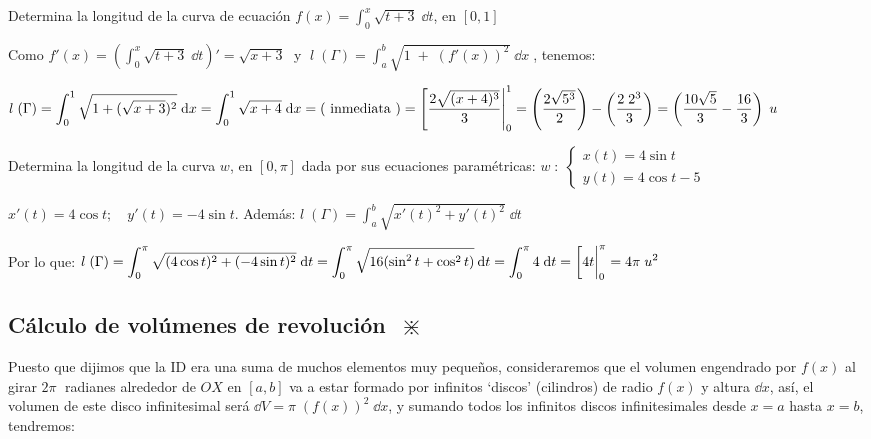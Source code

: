\begin{ejem}
Determina la longitud de la curva de ecuación $f(x)= \displaystyle \int_0^x \sqrt{t+3}\; \dd t$, en $[0,1]$

\vspace{2mm}

Como $f'(x)= \left( \displaystyle \int_0^x \sqrt{t+3}\; \dd t  \right)' =\sqrt{x+3}\;$ 	 y  $\; \displaystyle l\; (\Gamma)=\int_a^b \sqrt{1\; + \; (f'(x))^2}\; \dd x\;$, tenemos:

$\displaystyle l\; (\Gamma)= \int_0^1 \sqrt{ 1 + (\sqrt{x+3})^2 } \; \dd x = \int_0^1\sqrt{x+4}\; \dd x= (\text { inmediata })= \eval[\dfrac {2\sqrt{(x+4)^3}}{3}|_0^1= \left(\dfrac {2 \sqrt{5^3}}{2}  \right )-\left( \dfrac {2\; 2^3}{3} \right)= \left(\dfrac{10\sqrt{5}}{3}-\dfrac{16}{3} \right)\; u$

\end{ejem}

\begin{ejem}
Determina la longitud de la curva $w$, en $[0,\pi]$ dada por sus ecuaciones paramétricas: $w\; :\; \begin{cases} x(t)=4\sin t \\ y(t)=4\cos t - 5 \end{cases}$

\vspace{2mm}

$x'(t)=4\cos t; \quad y'(t)= -4\sin t$. Además: $\displaystyle l\; (\Gamma)=\int_a^b \sqrt{x'(t)^2 + y'(t)^2}\; \dd t$

Por lo que:  $\displaystyle l\; (\Gamma)=\int_0^{\pi}
\sqrt{(4 \cos t)^2 + (-4 \sin t)^2}\; \dd t = \int_0^{\pi} \sqrt{16(\sin^2 t + \cos^2 t)}\: \dd t = \int_0^{\pi} 4 \; \dd t= \eval[4t|_0^{\pi}= 4\pi\; u^2 $
	
\end{ejem}



\vspace{4mm}

\subsection{Cálculo de volúmenes de revolución $\; \divideontimes $}

Puesto que dijimos que la ID era una suma de muchos elementos muy pequeños, consideraremos que el volumen engendrado por $f(x)$ al girar $2\pi\;  $ radianes alrededor de $OX$ en $[a,b]$ va a estar formado por infinitos `discos' (cilindros) de radio $f(x)$ y altura $\dd x $, así, el volumen de este disco infinitesimal será $\dd V=\pi\; (f(x))^2\; \dd x$,  y sumando todos los infinitos discos infinitesimales desde $x=a$ hasta $x=b$, tendremos:

